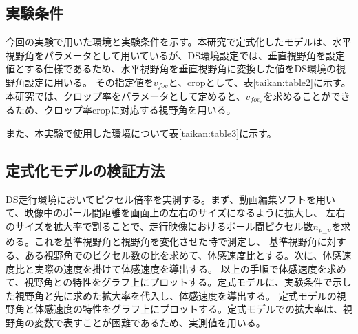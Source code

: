 \subsection{実験条件}
今回の実験で用いた環境と実験条件を示す。本研究で定式化したモデルは、水平視野角をパラメータとして用いているが、DS環境設定では、垂直視野角を設定値とする仕様であるため、水平視野角を垂直視野角に変換した値をDS環境の視野角設定に用いる。
その指定値を$v_{fov}$と、cropとして、表\ref{taikan:table2}に示す。本研究では、クロップ率をパラメータとして定めると、$v_{fov_v}$を求めることができるため、クロップ率cropに対応する視野角を用いる。

\begin{table}[ht]
  \centering
  \caption{水平視野角の指定値$v_{fov}$とクロップ率cropとの対応}
\end{table}%

また、本実験で使用した環境について表\ref{taikan:table3}に示す。

\begin{table}[ht]
  \centering
  \caption{本研究で使用した環境}
\end{table}

\subsection{定式化モデルの検証方法}
DS走行環境においてピクセル倍率を実測する。まず、動画編集ソフトを用いて、映像中のポール間距離を画面上の左右のサイズになるように拡大し、
左右のサイズを拡大率で割ることで、走行映像におけるポール間ピクセル数$n_{p_{\to}p}$を求める。これを基準視野角と視野角を変化させた時で測定し、
基準視野角に対する、ある視野角でのピクセル数の比を求めて、体感速度比とする。次に、体感速度比と実際の速度を掛けて体感速度を導出する。
以上の手順で体感速度を求めて、視野角との特性をグラフ上にプロットする。定式モデルに、実験条件で示した視野角と先に求めた拡大率を代入し、体感速度を導出する。
定式モデルの視野角と体感速度の特性をグラフ上にプロットする。定式モデルでの拡大率は、視野角の変数で表すことが困難であるため、実測値を用いる。

